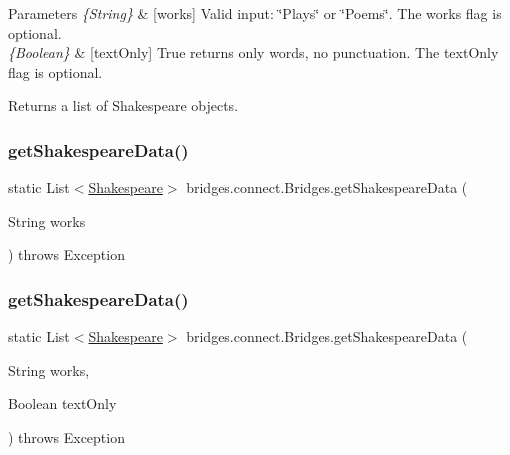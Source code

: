 \begin{DoxyParams}{Parameters}
{\em \{\+String\}} & \mbox{[}works\mbox{]} Valid input\+: \char`\"{}\+Plays\char`\"{} or \char`\"{}\+Poems\char`\"{}. The works flag is optional.\\
\hline
{\em \{\+Boolean\}} & \mbox{[}text\+Only\mbox{]} True returns only words, no punctuation. The text\+Only flag is optional.\\
\hline
\end{DoxyParams}
\begin{DoxyReturn}{Returns}
a list of Shakespeare objects. 
\end{DoxyReturn}
\mbox{\label{classbridges_1_1connect_1_1_bridges_a53ac587893826c57644f2e03b33ae455}} 
\subsubsection{\texorpdfstring{get\+Shakespeare\+Data()}{getShakespeareData()}\hspace{0.1cm}{\footnotesize\ttfamily [2/3]}}
{\footnotesize\ttfamily static List$<$\mbox{\hyperlink{classbridges_1_1data__src__dependent_1_1_shakespeare}{Shakespeare}}$>$ bridges.\+connect.\+Bridges.\+get\+Shakespeare\+Data (\begin{DoxyParamCaption}\item[{String}]{works }\end{DoxyParamCaption}) throws Exception\hspace{0.3cm}{\ttfamily [static]}}

\mbox{\label{classbridges_1_1connect_1_1_bridges_aa81c312e631bc76fa49e0ccae66679dc}} 
\subsubsection{\texorpdfstring{get\+Shakespeare\+Data()}{getShakespeareData()}\hspace{0.1cm}{\footnotesize\ttfamily [3/3]}}
{\footnotesize\ttfamily static List$<$\mbox{\hyperlink{classbridges_1_1data__src__dependent_1_1_shakespeare}{Shakespeare}}$>$ bridges.\+connect.\+Bridges.\+get\+Shakespeare\+Data (\begin{DoxyParamCaption}\item[{String}]{works,  }\item[{Boolean}]{text\+Only }\end{DoxyParamCaption}) throws Exception\hspace{0.3cm}{\ttfamily [static]}}

